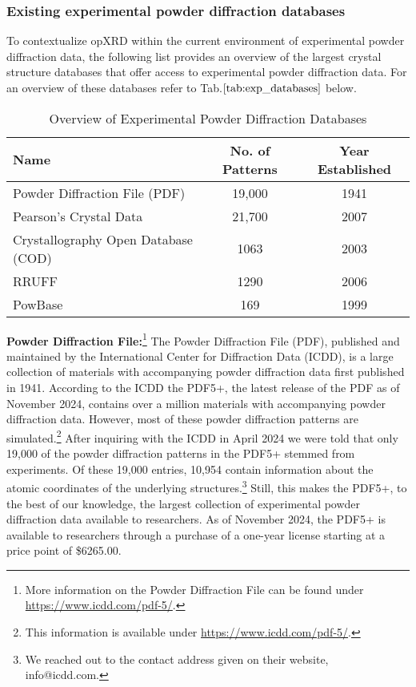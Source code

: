 \pagebreak

\subsubsection*{Existing experimental powder diffraction databases}
To contextualize opXRD within the current environment of experimental powder diffraction data, the following list provides an overview of the largest crystal structure databases that offer access to experimental powder diffraction data. For an overview of these databases refer to Tab.$\eqref{tab:exp_databases}$ below.\\

\begin{table}[!htb]
\centering
\caption{Overview of Experimental Powder Diffraction Databases}
\label{tab:exp_databases}
\begin{tabular}{@{}lcc@{}}
\toprule
\textbf{Name}                          & \textbf{No. of Patterns} & \textbf{Year Established} \\
\midrule
Powder Diffraction File (PDF)          & 19,000                  & 1941                      \\
Pearson's Crystal Data                  & 21,700                  & 2007        \\
Crystallography Open Database (COD)    & 1063                    & 2003                      \\
RRUFF                                  & 1290                    & 2006                      \\
PowBase                                & 169                     & 1999                      \\
\bottomrule
\end{tabular}
\end{table}

\textbf{Powder Diffraction File:}\footnote{More information on the Powder Diffraction File can be found under \url{https://www.icdd.com/pdf-5/}.} The Powder Diffraction File (PDF), published and maintained by the International Center for Diffraction Data (ICDD), is a large collection of materials with accompanying powder diffraction data first published in 1941\cite{GatesRector2019}. According to the ICDD the PDF5+, the latest release of the PDF as of November 2024, contains over a million materials with accompanying powder diffraction data. However, most of these powder diffraction patterns are simulated.\footnote{This information is available under \url{https://www.icdd.com/pdf-5/}.} After inquiring with the ICDD in April 2024 we were told that only 19,000 of the powder diffraction patterns in the PDF5+ stemmed from experiments. Of these 19,000 entries, 10,954 contain information about the atomic coordinates of the underlying structures.\footnote{We reached out to the contact address given on their website, info@icdd.com.} Still, this makes the PDF5+, to the best of our knowledge, the largest collection of experimental powder diffraction data available to researchers. As of November 2024, the PDF5+ is available to researchers through a purchase of a one-year license starting at a price point of \$6265.00.\\


